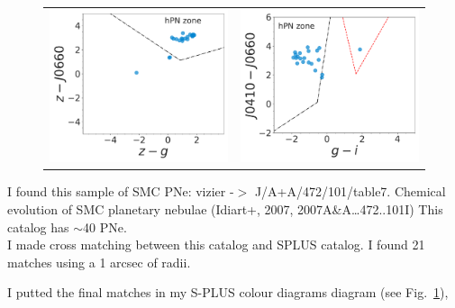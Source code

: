 \documentclass[11pt]{article}
\newcommand\raiselabel[1]{\raisebox{0.9\figwidth}[-0.5\figwidth]{#1}}
\begin{document}
\begin{figure}
\begin{tabular}{l l}
\includegraphics[width=0.5\linewidth, trim=10 10 10 10, clip]{Fig3-IDR2-SPLUS-z.pdf} & \includegraphics[width=0.5\linewidth, trim=10 10 10 10, clip]{Fig5-IDR2-SPLUS-gi.pdf} \\
\end{tabular}
\caption{}
\label{fig:smppne}
\end{figure}

I found this sample of SMC PNe: vizier -$>$ J/A+A/472/101/table7. Chemical evolution of SMC planetary nebulae (Idiart+, 2007, 2007A\&A…472..101I) This catalog has $\sim$40 PNe.\\

I made cross matching between this catalog and SPLUS catalog. I found 21 matches using a 1 arcsec of radii. 

I putted the final matches in my S-PLUS colour diagrams diagram (see Fig.~\ref{fig:smppne}),


\newpage
\begin{longtable}{ccc}
  
\end{longtable}
\end{document}
